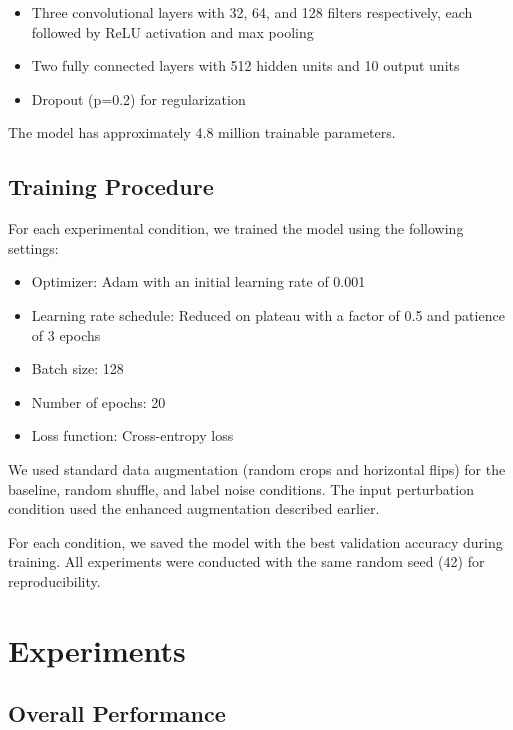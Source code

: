 \documentclass[10pt,twocolumn,letterpaper]{article}
\begin{document}
\begin{itemize}
    \item Three convolutional layers with 32, 64, and 128 filters respectively, each followed by ReLU activation and max pooling
    \item Two fully connected layers with 512 hidden units and 10 output units
    \item Dropout (p=0.2) for regularization
\end{itemize}

The model has approximately 4.8 million trainable parameters.

\subsection{Training Procedure}
For each experimental condition, we trained the model using the following settings:

\begin{itemize}
    \item Optimizer: Adam with an initial learning rate of 0.001
    \item Learning rate schedule: Reduced on plateau with a factor of 0.5 and patience of 3 epochs
    \item Batch size: 128
    \item Number of epochs: 20
    \item Loss function: Cross-entropy loss
\end{itemize}

We used standard data augmentation (random crops and horizontal flips) for the baseline, random shuffle, and label noise conditions.
The input perturbation condition used the enhanced augmentation described earlier.

For each condition, we saved the model with the best validation accuracy during training.
All experiments were conducted with the same random seed (42) for reproducibility.

\section{Experiments}
\label{sec:experiments}

\subsection{Overall Performance}
\end{document}
